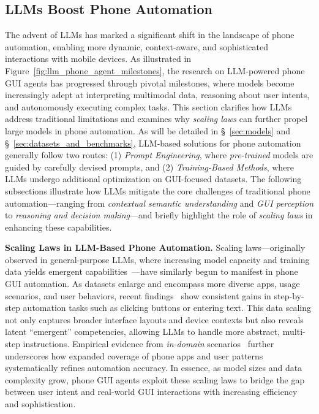 \subsection{LLMs Boost Phone Automation}
\label{subsec:llms_boost_automation}

The advent of LLMs has marked a significant shift in the landscape of phone automation, enabling more dynamic, context-aware, and sophisticated interactions with mobile devices. As illustrated in Figure~\ref{fig:llm_phone_agent_milestones}, the research on LLM-powered phone GUI agents has progressed through pivotal milestones, where models become increasingly adept at interpreting multimodal data, reasoning about user intents, and autonomously executing complex tasks. This section clarifies how LLMs address traditional limitations and examines why \emph{scaling laws} can further propel large models in phone automation.
As will be detailed in \S\ \ref{sec:models} and \S\ \ref{sec:datasets_and_benchmarks}, LLM-based solutions for phone automation generally follow two routes: (1) \emph{Prompt Engineering}, where \emph{pre-trained} models are guided by carefully devised prompts, and (2) \emph{Training-Based Methods}, where LLMs undergo additional optimization on GUI-focused datasets. The following subsections illustrate how LLMs mitigate the core challenges of traditional phone automation—ranging from \emph{contextual semantic understanding} and \emph{GUI perception} to \emph{reasoning and decision making}—and briefly highlight the role of \emph{scaling laws} in enhancing these capabilities.



\noindent\textbf{Scaling Laws in LLM-Based Phone Automation.}
Scaling laws—originally observed in general-purpose LLMs, where increasing model capacity and training data yields emergent capabilities~\cite{brown2020language,kaplan2020scaling,hagendorff2023machine}—have similarly begun to manifest in phone GUI automation. As datasets enlarge and encompass more diverse apps, usage scenarios, and user behaviors, recent findings~\cite{cheng2024seeclick,chen2024guicourse,lu2024guiodyssey,pawlowski2024tinyclick} show consistent gains in step-by-step automation tasks such as clicking buttons or entering text. This data scaling not only captures broader interface layouts and device contexts but also reveals latent “emergent” competencies, allowing LLMs to handle more abstract, multi-step instructions. Empirical evidence from \emph{in-domain} scenarios~\cite{li2024androidcontrol} further underscores how expanded coverage of phone apps and user patterns systematically refines automation accuracy. In essence, as model sizes and data complexity grow, phone GUI agents exploit these scaling laws to bridge the gap between user intent and real-world GUI interactions with increasing efficiency and sophistication.


